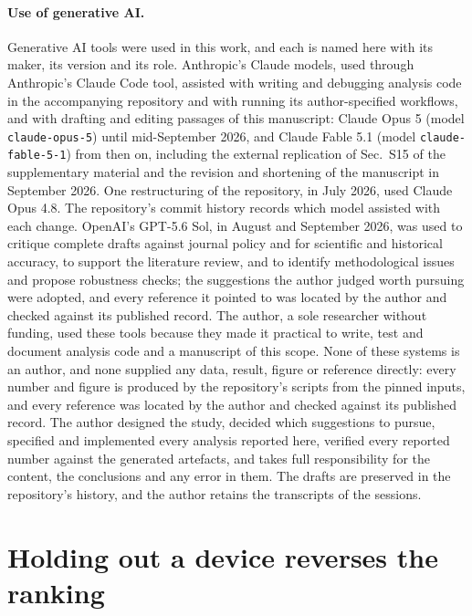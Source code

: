 \documentclass[aip,pop,preprint,amsmath,amssymb]{revtex4-2}
\begin{document}
\paragraph*{Use of generative AI.}
Generative AI tools were used in this work, and each is named here with its
maker, its version and its role. Anthropic's Claude models, used through
Anthropic's Claude Code tool, assisted with writing and debugging analysis
code in the accompanying repository and with running its author-specified
workflows, and with
drafting and editing passages of this manuscript: Claude Opus 5 (model
\texttt{claude-opus-5}) until mid-September 2026, and Claude Fable 5.1 (model
\texttt{claude-fable-5-1}) from then on, including the external replication of
Sec.~S15 of the supplementary material and the revision and shortening of the
manuscript in September 2026. One restructuring of the repository, in July 2026, used Claude Opus 4.8.
The repository's commit history records which model assisted with each change.
OpenAI's GPT-5.6 Sol, in August and September 2026, was used to critique
complete drafts against journal policy and for scientific and historical
accuracy, to support the literature review, and to identify methodological
issues and propose robustness checks; the suggestions the author judged worth
pursuing were adopted, and every reference it pointed to was located by the
author and checked against its published record. The author, a sole researcher
without funding, used these tools because they made it practical to write, test
and document analysis code and a manuscript of this scope. None of these systems is
an author, and none supplied any data, result, figure or reference directly: every
number and figure is produced by the repository's scripts from the pinned
inputs, and every reference was located by the author and checked against its
published record. The author designed the study, decided which suggestions to
pursue, specified and implemented every analysis reported here, verified every
reported number against the generated artefacts, and takes full responsibility
for the content, the conclusions and any error in them. The drafts are
preserved in the repository's history, and the author retains the transcripts
of the sessions.

\section{Holding out a device reverses the ranking}
\label{sec:reversal}
\end{document}
